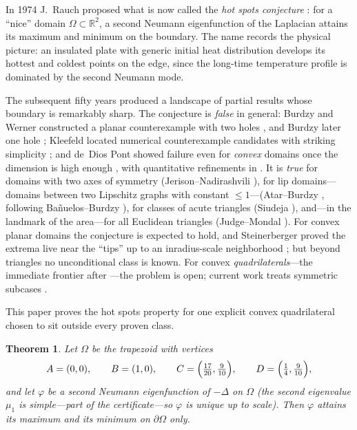 \documentclass[11pt]{article}
\newtheorem{theorem}{Theorem}
\newcommand{\R}{\mathbb{R}}
\begin{document}
In 1974 J.~Rauch proposed what is now called the \emph{hot spots
conjecture} \cite{Rauch}: for a ``nice'' domain $\Omega\subset\R^2$, a
second Neumann eigenfunction of the Laplacian attains its maximum and
minimum on the boundary. The name records the physical picture: an
insulated plate with generic initial heat distribution develops its
hottest and coldest points on the edge, since the long-time temperature
profile is dominated by the second Neumann mode.

The subsequent fifty years produced a landscape of partial results whose
boundary is remarkably sharp. The conjecture is \emph{false} in general:
Burdzy and Werner constructed a planar counterexample with two holes
\cite{BurdzyWerner}, and Burdzy later one hole \cite{Burdzy2005};
Kleefeld located numerical counterexample candidates with striking
simplicity \cite{Kleefeld}; and de~Dios Pont showed failure even for
\emph{convex} domains once the dimension is high enough \cite{dDP}, with
quantitative refinements in \cite{dDPHT}. It is \emph{true} for domains
with two axes of symmetry (Jerison--Nadirashvili \cite{JerisonNadirashvili}),
for lip domains---domains between two Lipschitz graphs with constant
$\le 1$---(Atar--Burdzy \cite{AtarBurdzy}, following
Ba\~nuelos--Burdzy \cite{BanuelosBurdzy}), for classes of acute triangles
(Siudeja \cite{Siudeja}), and---in the landmark of the area---for all
Euclidean triangles (Judge--Mondal \cite{JudgeMondal}). For convex
planar domains the conjecture is expected to hold, and Steinerberger
proved the extrema live near the ``tips'' up to an inradius-scale
neighborhood \cite{Steinerberger}; but beyond triangles no unconditional
class is known. For convex \emph{quadrilaterals}---the immediate
frontier after \cite{JudgeMondal}---the problem is open; current work
treats symmetric subcases \cite{SymQuad}.

This paper proves the hot spots property for one explicit convex
quadrilateral chosen to sit outside every proven class.

\begin{theorem}\label{thm:main}
Let $\Omega$ be the trapezoid with vertices
\[
A=(0,0),\qquad B=(1,0),\qquad C=\Bigl(\tfrac{17}{20},\tfrac{9}{10}\Bigr),
\qquad D=\Bigl(\tfrac14,\tfrac{9}{10}\Bigr),
\]
and let $\varphi$ be a second Neumann eigenfunction of $-\Delta$ on
$\Omega$ (the second eigenvalue $\mu_1$ is simple---part of the
certificate---so $\varphi$ is unique up to scale). Then $\varphi$
attains its maximum and its minimum on $\partial\Omega$ only.
\end{theorem}
\end{document}
